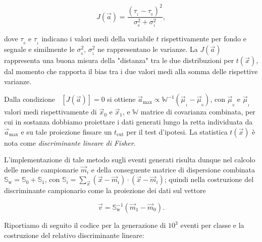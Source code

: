 \smallskip

\begin{equation*}
J(\vec{a}) = \frac{(\tau_{_1} - \tau_{_0})^2}{\sigma_{_0}^2 + \sigma_{_1}^2},
\end{equation*}

\smallskip

\noindent dove $\tau_{_0}$ e $\tau_{_1}$ indicano i valori medi della variabile $t$ rispettivamente per fondo e segnale e similmente le $\sigma_{_0}^2,\,\sigma_{_1}^2$ ne rappresentano le varianze. La $J(\vec{a})$ rappresenta una buona misura  della "distanza" tra le due distribuzioni per $t(\vec{x})$, dal momento che rapporta il bias tra i due valori medi alla somma delle rispettive varianze.\\

\vfill

\noindent Dalla condizione $\mathop{\partial_{\vec{a}}}[J(\vec{a})] = 0$ si ottiene  $\vec{a}_\mathrm{max} \propto \mathbb{W}^{-1}(\vec{\mu}_{_1} - \vec{\mu}_{_0})$, con $\vec{\mu}_{_0}$ e $\vec{\mu}_{_1}$ valori medi rispettivamente di $\vec{x}_0$ e $\vec{x}_1$, e $\mathbb{W}$ matrice di covarianza combinata, per cui in sostanza dobbiamo proiettare i dati generati lungo la retta individuata da $\vec{a}_\mathrm{max}$ e su tale proiezione fissare un $t_\mathrm{cut}$ per il test d'ipotesi. La statistica $t(\vec{x})$ è nota come \emph{discriminante lineare di Fisher}.\\

\vfill
\vfill

\noindent L'implementazione di tale metodo sugli eventi generati risulta dunque nel calcolo delle medie campionarie $\vec{m}_i$ e della conseguente matrice di dispersione combinata $\mathbb{S}_\mathrm{w} = \mathbb{S}_0 + \mathbb{S}_1$, con $\mathbb{S}_i = \sum_{\vec{x}}(\vec{x} - \vec{m}_i)\cdot(\vec{x} - \vec{m}_i)$; quindi nella costruzione del discriminante campionario come la proiezione dei dati sul vettore

\vfill

\begin{equation*}
\vec{v} = \mathbb{S}_\mathrm{w} ^{-1}(\vec{m}_1 - \vec{m}_0).
\end{equation*}

\vfill
\vfill
\vfill
\newpage

\noindent Riportiamo di seguito il codice per la generazione di $10^3$ eventi per classe e la costruzione del relativo discriminante lineare:

